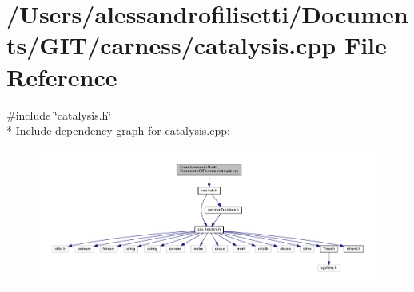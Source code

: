 \hypertarget{a00053}{\section{/\+Users/alessandrofilisetti/\+Documents/\+G\+I\+T/carness/catalysis.cpp File Reference}
\label{a00053}
}
{\ttfamily \#include \char`\"{}catalysis.\+h\char`\"{}}\\*
Include dependency graph for catalysis.\+cpp\+:\nopagebreak
\begin{figure}[H]
\begin{center}
\leavevmode
\includegraphics[width=350pt]{a00167}
\end{center}
\end{figure}
